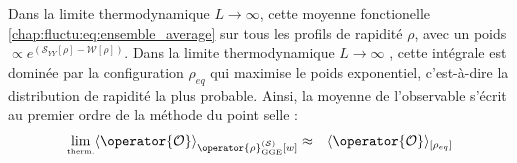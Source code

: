 {\medskip

Dans la limite thermodynamique \(L\to\infty\), cette moyenne fonctionelle \eqref{chap:fluctu:eq:ensemble_average} sur tous les profils de rapidité $\rho$, avec un poids $\propto e^{(\mathcal{S}_{YY}[\rho] - \mathcal{W}[\rho])}$. Dans la limite thermodynamique $L \to \infty$ , cette intégrale est dominée par la configuration $ \rho_{eq}$ qui maximise le poids exponentiel, c’est-à-dire la distribution de rapidité la plus probable. Ainsi, la moyenne de l’observable s’écrit au premier ordre de la méthode du point selle :
\begin{eqnarray}
	\underset{\mbox{\tiny therm.}}{\lim}\langle \operator{\mathcal{O}} \rangle_{\operator{\rho}_{\mathrm{GGE}}^{(\mathcal{S})}[w]} & \approx & \langle\operator{\mathcal{O}} \rangle_{[\rho_{eq}]}	
	\label{chap:fluctu:eq:ensemble_average:approx}
\end{eqnarray}
}
	




